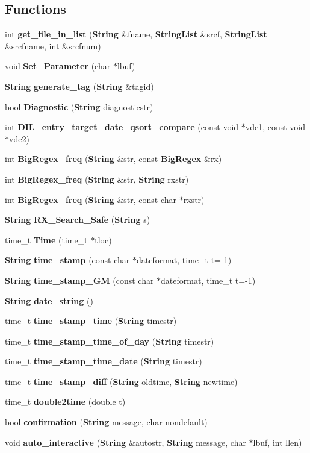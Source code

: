 \subsection*{Functions}
\begin{CompactItemize}
\item 
int {\bf get\_\-file\_\-in\_\-list} ({\bf String} \&fname, {\bf String\-List} \&srcf, {\bf String\-List} \&srcfname, int \&srcfnum)
\item 
void {\bf Set\_\-Parameter} (char $\ast$lbuf)
\item 
{\bf String} {\bf generate\_\-tag} ({\bf String} \&tagid)
\item 
bool {\bf Diagnostic} ({\bf String} diagnosticstr)
\item 
int {\bf DIL\_\-entry\_\-target\_\-date\_\-qsort\_\-compare} (const void $\ast$vde1, const void $\ast$vde2)
\item 
int {\bf Big\-Regex\_\-freq} ({\bf String} \&str, const {\bf Big\-Regex} \&rx)
\item 
int {\bf Big\-Regex\_\-freq} ({\bf String} \&str, {\bf String} rxstr)
\item 
int {\bf Big\-Regex\_\-freq} ({\bf String} \&str, const char $\ast$rxstr)
\item 
{\bf String} {\bf RX\_\-Search\_\-Safe} ({\bf String} s)
\item 
time\_\-t {\bf Time} (time\_\-t $\ast$tloc)
\item 
{\bf String} {\bf time\_\-stamp} (const char $\ast$dateformat, time\_\-t t=-1)
\item 
{\bf String} {\bf time\_\-stamp\_\-GM} (const char $\ast$dateformat, time\_\-t t=-1)
\item 
{\bf String} {\bf date\_\-string} ()
\item 
time\_\-t {\bf time\_\-stamp\_\-time} ({\bf String} timestr)
\item 
time\_\-t {\bf time\_\-stamp\_\-time\_\-of\_\-day} ({\bf String} timestr)
\item 
time\_\-t {\bf time\_\-stamp\_\-time\_\-date} ({\bf String} timestr)
\item 
time\_\-t {\bf time\_\-stamp\_\-diff} ({\bf String} oldtime, {\bf String} newtime)
\item 
time\_\-t {\bf double2time} (double t)
\item 
bool {\bf confirmation} ({\bf String} message, char nondefault)
\item 
void {\bf auto\_\-interactive} ({\bf String} \&autostr, {\bf String} message, char $\ast$lbuf, int llen)

\end{CompactItemize}

